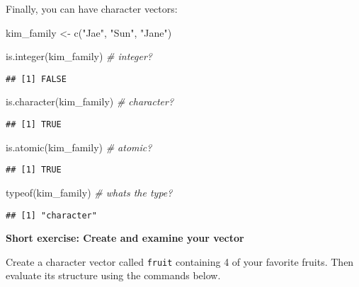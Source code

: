 \documentclass[
]{book}
\newenvironment{Shaded}{\begin{snugshade}}{\end{snugshade}}
\newcommand{\CommentTok}[1]{\textcolor[rgb]{0.56,0.35,0.01}{\textit{#1}}}
\newcommand{\FunctionTok}[1]{\textcolor[rgb]{0.00,0.00,0.00}{#1}}
\newcommand{\NormalTok}[1]{#1}
\newcommand{\OtherTok}[1]{\textcolor[rgb]{0.56,0.35,0.01}{#1}}
\newcommand{\StringTok}[1]{\textcolor[rgb]{0.31,0.60,0.02}{#1}}
\begin{document}
Finally, you can have character vectors:

\begin{Shaded}
\begin{Highlighting}[]
\NormalTok{kim\_family }\OtherTok{\textless{}{-}} \FunctionTok{c}\NormalTok{(}\StringTok{"Jae"}\NormalTok{, }\StringTok{"Sun"}\NormalTok{, }\StringTok{"Jane"}\NormalTok{)}

\FunctionTok{is.integer}\NormalTok{(kim\_family) }\CommentTok{\# integer?}
\end{Highlighting}
\end{Shaded}

\begin{verbatim}
## [1] FALSE
\end{verbatim}

\begin{Shaded}
\begin{Highlighting}[]
\FunctionTok{is.character}\NormalTok{(kim\_family) }\CommentTok{\# character?}
\end{Highlighting}
\end{Shaded}

\begin{verbatim}
## [1] TRUE
\end{verbatim}

\begin{Shaded}
\begin{Highlighting}[]
\FunctionTok{is.atomic}\NormalTok{(kim\_family) }\CommentTok{\# atomic?}
\end{Highlighting}
\end{Shaded}

\begin{verbatim}
## [1] TRUE
\end{verbatim}

\begin{Shaded}
\begin{Highlighting}[]
\FunctionTok{typeof}\NormalTok{(kim\_family) }\CommentTok{\# what\textquotesingle{}s the type?}
\end{Highlighting}
\end{Shaded}

\begin{verbatim}
## [1] "character"
\end{verbatim}

\textbf{Short exercise: Create and examine your vector}

Create a character vector called \texttt{fruit} containing 4 of your favorite fruits. Then evaluate its structure using the commands below.
\end{document}
